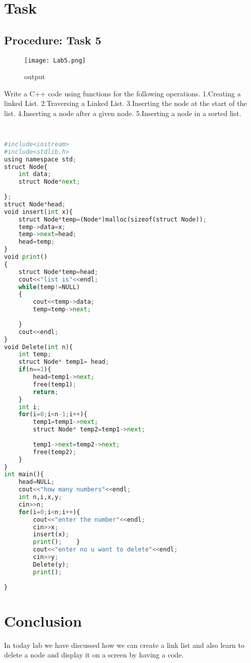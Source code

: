 \documentclass[11pt]{article}            %
\begin{document}
\section{Task}  
\subsection{Procedure: Task 5 }     

\begin{figure*}
\centering
  \texttt{[image: Lab5.png]}
\caption{output}
\label{Figure:Untitled}    
\end{figure*}
Write a C++ code using functions for the following operations.
1.Creating a linked List.
2.Traversing a Linked List.
3.Inserting the node at the start of the list.
4.Inserting a node after a given node.
5.Inserting a node in a sorted list.

\subsection{ }     

\begin{lstlisting}[language=Python]
 
#include<iostream>
#include<stdlib.h>
using namespace std;
struct Node{
	int data;
	struct Node*next;
	
};
struct Node*head;
void insert(int x){
	struct Node*temp=(Node*)malloc(sizeof(struct Node));
	temp->data=x;
	temp->next=head;
	head=temp;
}
void print()
{
	struct Node*temp=head;
	cout<<"list is"<<endl;
	while(temp!=NULL)
	{
		cout<<temp->data;
		temp=temp->next;
		
	}
	cout<<endl;
}
void Delete(int n){
	int temp;
	struct Node* temp1= head;
	if(n==1){
		head=temp1->next;
		free(temp1);
		return;
	}
	int i; 
	for(i=0;i<n-1;i++){
		temp1=temp1->next;
		struct Node* temp2=temp1->next;
	
		temp1->next=temp2->next;
		free(temp2);
	}
}
int main(){
	head=NULL;
	cout<<"how many numbers"<<endl;
	int n,i,x,y;
	cin>>n;
	for(i=0;i<n;i++){
		cout<<"enter the number"<<endl;
		cin>>x;
		insert(x);
		print();	}	
		cout<<"enter no u want to delete"<<endl;
		cin>>y;
		Delete(y);
		print();
	
}
\end{lstlisting}

\section{Conclusion}  
In today lab we have discussed how we can create a link list and also learn to delete a node and display it on a screen by having a code.

 
\end{document}
